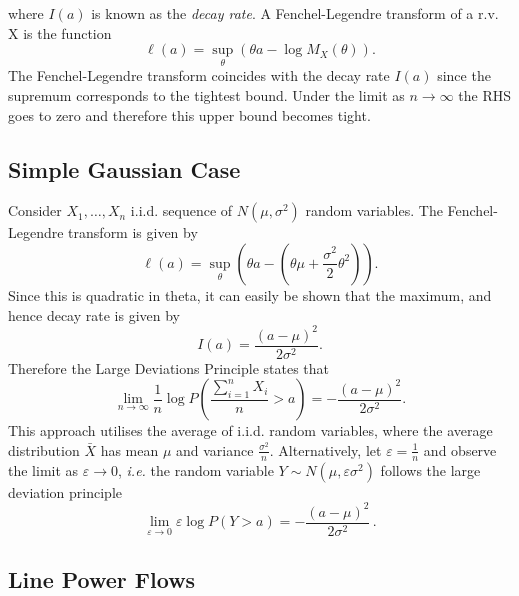 \documentclass{article}
\newcommand{\ie}{\textit{i.e. }}
\newcommand{\iid}{i.i.d. }
\newcommand{\e}{\varepsilon}
\renewcommand{\l}{\ell}
\begin{document}
where $I(a)$ is known as the {\it decay rate}. A Fenchel-Legendre transform of a r.v. X is the function 
\[\l(a) = \sup_\theta (\theta a - \log M_X(\theta)).\]
The Fenchel-Legendre transform coincides with the decay rate $I(a)$ since the supremum corresponds to the tightest bound. Under the limit as $n\to \infty$ the RHS goes to zero and therefore this upper bound becomes tight. 

\subsection{Simple Gaussian Case}
Consider $X_1,\dots,X_n$ \iid sequence of $N(\mu ,\sigma^2)$ random variables. The Fenchel-Legendre transform is given by
\[\l(a) = \sup_\theta (\theta a - (\theta\mu+\frac{\sigma^2}{2}\theta^2)).\]
Since this is quadratic in theta, it can easily be shown that the maximum, and hence decay rate is given by 
\[I(a) = \frac{(a-\mu)^2}{2\sigma^2}.\]
Therefore the Large Deviations Principle states that 
\[\lim_{n\to\infty} \frac{1}{n} \log P\left(\frac{\sum_{i=1}^{n} X_i }{n}>a\right) = -\frac{(a-\mu)^2}{2\sigma^2}.\]
This approach utilises the average of \iid random variables, where the average distribution $\bar X$ has mean $\mu$ and variance $\frac{\sigma^2}{n}$. Alternatively, let $\e=\frac{1}{n}$ and observe the limit as $\e\to 0$, \ie the random variable $Y\sim N(\mu, \e \sigma^2)$ follows the large deviation principle
\[\lim_{\e\to 0} \e \log P(Y>a) =-\frac{(a-\mu)^2}{2\sigma^2}\,.\]

\subsection{Line Power Flows}
\end{document}
